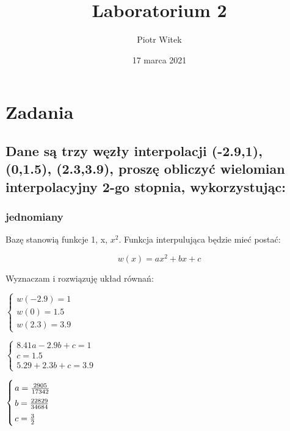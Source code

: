 \documentclass[5]{article}
\title{Laboratorium 2}
\author{Piotr Witek}
\date{17 marca 2021}
\begin{document}

\maketitle

\section{Zadania}

\subsection{Dane są trzy węzły interpolacji (-2.9,1), (0,1.5), (2.3,3.9), proszę obliczyć wielomian interpolacyjny 2-go stopnia, wykorzystując:}

\subsubsection{jednomiany}

Bazę stanowią funkcje 1, x, $x^2$. Funkcja interpulująca będzie mieć postać:

\[w(x) = ax^2+bx+c\]

\begin{flushleft}
Wyznaczam i rozwiązuję układ równań:
\end{flushleft}

\begin{flushleft}
$
\left\{ \begin{array}{ll}
w(-2.9)=1\\
w(0)=1.5\\
w(2.3) = 3.9
\end{array} \right.
$
\end{flushleft}
\begin{flushleft}
$
\left\{ \begin{array}{ll}
8.41a-2.9b+c=1\\
c=1.5\\
5.29+2.3b+c=3.9
\end{array} \right.
$
\end{flushleft}

\begin{flushleft}
$
\left\{
\arraycolsep=1.4pt\def\arraystretch{1.5}
\begin{array}{ll}
a=\frac{2905}{17342}\\
b=\frac{22829}{34684}\\
c=\frac{3}{2}
\end{array} \right.
$
\end{flushleft}
\end{document}

